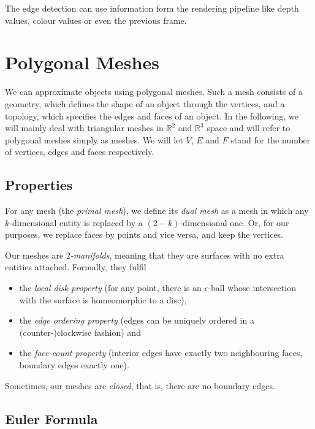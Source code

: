 \documentclass{panikzettel}
\begin{document}
The edge detection can use information form the rendering pipeline like depth values, colour values or even the previous frame.

\section{Polygonal Meshes}

We can approximate objects using polygonal meshes. Such a mesh consists of a geometry, which defines the shape of an object through the vertices, and a topology, which specifies the edges and faces of an object. In the following, we will mainly deal with triangular meshes in $\mathbb{R}^2$ and $\mathbb{R}^3$ space and will refer to polygonal meshes simply as meshes. We will let $V$, $E$ and $F$ stand for the number of vertices, edges and faces respectively.

\subsection{Properties}

For any mesh (the \emph{primal mesh}), we define its \emph{dual mesh} as a mesh in which any $k$-dimensional entity is replaced by a $(2-k)$-dimensional one. Or, for our purposes, we replace faces by points and vice versa, and keep the vertices.

Our meshes are $2$\emph{-manifolds}, meaning that they are surfaces with no extra entities attached. Formally, they fulfil

\begin{itemize}
    \item the \emph{local disk property} (for any point, there is an $\epsilon$-ball whose intersection with the surface is homeomorphic to a disc),
    \item the \emph{edge ordering property} (edges can be uniquely ordered in a (counter-)clockwise fashion) and
    \item the \emph{face count property} (interior edges have exactly two neighbouring faces, boundary edges exactly one).
\end{itemize}

Sometimes, our meshes are \emph{closed}, that is, there are no boundary edges.

\subsection{Euler Formula}
\end{document}
